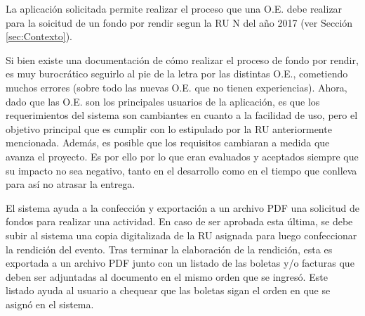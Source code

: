 La aplicación solicitada permite realizar el proceso que una O.E. debe realizar para la soicitud de un fondo por rendir segun la RU N del año 2017 (ver Sección \ref{sec:Contexto}).

Si bien existe una documentación de cómo realizar el proceso de fondo por rendir, es muy burocrático seguirlo al pie de la letra por las distintas O.E., cometiendo muchos errores (sobre todo las nuevas O.E. que no tienen experiencias). Ahora, dado que las O.E. son los principales usuarios de la aplicación, es que los requerimientos del sistema son cambiantes en cuanto a la facilidad de uso, pero el objetivo principal que es cumplir con lo estipulado por la RU anteriormente mencionada. Además, es posible que los requisitos cambiaran a medida que avanza el proyecto. Es por ello por lo que eran evaluados y aceptados siempre que su impacto no sea negativo, tanto en el desarrollo como en el tiempo que conlleva para así no atrasar la entrega.

El sistema ayuda a la confección y exportación a un archivo PDF una solicitud de fondos para realizar una actividad. En caso de ser aprobada esta última, se debe subir al sistema una copia digitalizada de la RU asignada para luego confeccionar la rendición del evento. Tras terminar la elaboración de la rendición, esta es exportada a un archivo PDF junto con un listado de las boletas y/o facturas que deben ser adjuntadas al documento en el mismo orden que se ingresó. Este listado ayuda al usuario a chequear que las boletas sigan el orden en que se asignó en el sistema.

